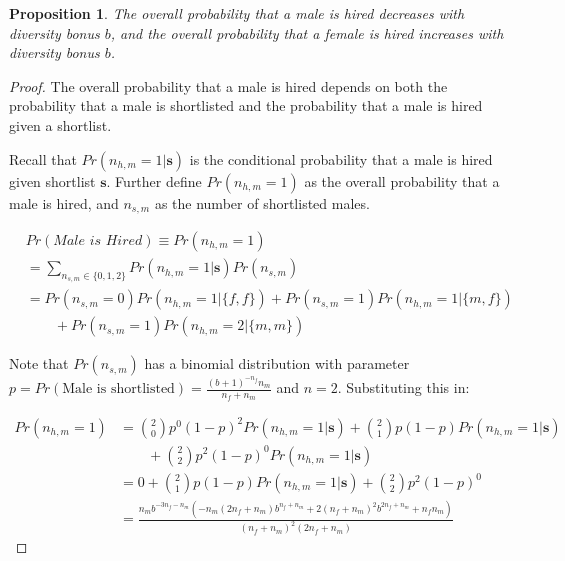 \documentclass[11pt]{article}
\newtheorem{proposition}{Proposition}
\begin{document}
\begin{proposition}
    The overall probability that a male is hired decreases with diversity bonus $b$, and the overall probability that a female is hired increases with diversity bonus $b$.
\end{proposition}

\begin{proof}
    The overall probability that a male is hired depends on both the probability that a male is shortlisted and the probability that a male is hired given a shortlist.

    Recall that $Pr(n_{h,m}=1|\bm{s})$ is the conditional probability that a male is hired given shortlist $\bm{s}$. Further define $Pr(n_{h,m}=1)$ as the overall probability that a male is hired, and $n_{s,m}$ as the number of shortlisted males.

    \begin{align*}
         & Pr(\textit{Male is Hired}) \equiv Pr(n_{h,m}=1)                               \\
         & = \sum\nolimits_{n_{s,m} \in \{0,1,2\}} Pr(n_{h,m}=1|\bm{s}) Pr(n_{s,m})      \\
         & = Pr(n_{s,m} = 0)Pr(n_{h,m}=1|\{f,f\}) + Pr(n_{s,m} = 1)Pr(n_{h,m}=1|\{m,f\}) \\
         & \qquad + Pr(n_{s,m} = 1)Pr(n_{h,m}=2|\{m,m\})
    \end{align*}

    Note that $Pr(n_{s,m})$ has a binomial distribution with parameter $p=Pr(\text{Male is shortlisted})=\frac{(b+1)^{-n_f} n_m}{n_f+n_m}$ and $n=2$. Substituting this in:

    \begin{align*}
        Pr(n_{h,m}=1) & = \binom{2}{0}p^0(1-p)^2 Pr(n_{h,m}=1|\bm{s}) +  \binom{2}{1}p(1-p) Pr(n_{h,m}=1|\bm{s})                                           \\
                      & \qquad + \binom{2}{2}p^2(1-p)^0 Pr(n_{h,m}=1|\bm{s})                                                                               \\
                      & =  0 + \binom{2}{1}p(1-p) Pr(n_{h,m}=1|\bm{s}) + \binom{2}{2}p^2(1-p)^0                                                            \\
                      & = \frac{n_m b^{-3 n_f-n_m} \left(-n_m (2 n_f+n_m) b^{n_f+n_m}+2 (n_f+n_m)^2 b^{2 n_f+n_m}+n_f n_m\right)}{(n_f+n_m)^2 (2 n_f+n_m)}
    \end{align*}



\end{proof}
\end{document}

